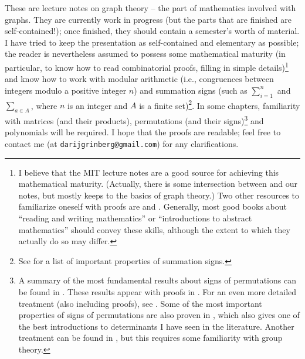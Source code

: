 \documentclass[numbers=enddot,12pt,final,onecolumn,notitlepage]{scrartcl}%
\theoremstyle{definition}
\let\sumnonlimits\sum
\renewcommand{\sum}{\sumnonlimits\limits}
\begin{document}
These are lecture notes on graph theory -- the part of mathematics
involved with graphs. They are currently work in
progress (but the parts that are finished are self-contained!);
once finished, they should contain a semester's worth of
material. I have tried to keep the presentation as self-contained and
elementary as possible; the reader is nevertheless assumed to possess
some mathematical maturity (in particular, to know how to read
combinatorial proofs, filling in simple details)\footnote{I believe
that the MIT lecture notes \cite{LeLeMe16} are a good source for
achieving this mathematical maturity. (Actually, there is some
intersection between \cite[Chapters 10 and 12]{LeLeMe16} and our
notes, but \cite{LeLeMe16} mostly keeps to the basics of graph
theory.)
Two other resources to familiarize oneself with proofs are
\cite{Hammac15} and \cite{Day-proofs}.
Generally, most good books about ``reading and
writing mathematics'' or ``introductions to abstract mathematics''
should convey these skills, although the extent to which they actually
do so may differ.}
and know how to work
with modular arithmetic (i.e., congruences between integers modulo a
positive integer $n$) and summation signs (such as $\sum_{i=1}^n$ and
$\sum_{a \in A}$, where $n$ is an integer and $A$ is a finite
set)\footnote{See \cite[\S 1.4]{detnotes} for a list of important
properties of summation signs.}.
In some chapters, familiarity with matrices (and their products),
permutations (and their signs)\footnote{A summary of the most
fundamental results about signs of permutations can be found in
\cite[\S 8.1]{LaNaSc16}. These results appear with proofs in
\cite[Chapter 6.B]{Day-proofs}. For an even more detailed treatment
(also including proofs),
see \cite[\S 5.1--5.3]{detnotes}. Some of the most important
properties of signs of permutations are also proven in
\cite[Appendix B]{Strick13}, which also gives one of the best
introductions to determinants I have seen in the literature.
Another treatment can be found in
\cite{Conrad-sign}, but this requires some familiarity with group
theory.}
and polynomials will be required.
I hope that the proofs are readable; feel free to contact me (at
\texttt{darijgrinberg@gmail.com}) for any clarifications.
\end{document}
